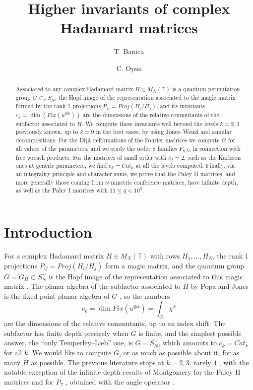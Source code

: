 \documentclass[11pt]{amsart}
\title[Complex Hadamard matrices]{Higher invariants of complex Hadamard matrices}
\author{T. Banica}
\author{C. Opus}
\newcommand{\T}{\mathbb T}
\begin{document}
\begin{abstract}
Associated to any complex Hadamard matrix $H\in M_N(\mathbb T)$ is a quantum permutation group $G\subset_uS_N^+$, the Hopf image of the representation associated to the magic matrix formed by the rank 1 projections $P_{ij}=Proj(H_i/H_j)$, and its invariants $c_k=\dim(Fix(u^{\otimes k}))$ are the dimensions of the relative commutants of the subfactor associated to $H$. We compute these invariants well beyond the levels $k=2,3$ previously known, up to $k=9$ in the best cases, by using Jones--Wenzl and annular decompositions. For the Di\c t\u a deformations of the Fourier matrices we compute $G$ for all values of the parameters, and we study the order 8 families $F_{8,5}$, in connection with free wreath products. For the matrices of small order with $c_2=2$, such as the Karlsson ones at generic parameters, we find $c_k=Cat_k$ at all the levels computed. Finally, via an integrality principle and character sums, we prove that the Paley II matrices, and more generally those coming from symmetric conference matrices, have infinite depth, as well as the Paley I matrices with $11\leq q<10^5$.
\end{abstract}
\maketitle
\setcounter{tocdepth}{1}
\tableofcontents

\section*{Introduction}

For a complex Hadamard matrix $H\in M_N(\T)$ with rows $H_1,\ldots,H_N$, the rank 1 projections $P_{ij}=Proj(H_i/H_j)$ form a magic matrix, and the quantum group $G=G_H\subset S_N^+$ is the Hopf image of the representation associated to this magic matrix \cite{bb1,bbs}. The planar algebra of the subfactor associated to $H$ by Popa and Jones \cite{jon,pop} is the fixed point planar algebra of $G$ \cite{bbs}, so the numbers
$$c_k=\dim Fix(u^{\otimes k})=\int_G\chi^k$$
are the dimensions of the relative commutants, up to an index shift. The subfactor has finite depth precisely when $G$ is finite, and the simplest possible answer, the ``only Temperley--Lieb'' one, is $G=S_N^+$, which amounts to $c_k=Cat_k$ for all $k$. We would like to compute $G$, or as much as possible about it, for as many $H$ as possible. The previous literature stops at $k=2,3$, rarely $4$ \cite{cn,ni}, with the notable exception of the infinite depth results of Montgomery for the Paley II matrices and for $P_7$ \cite{mo2,mo3}, obtained with the angle operator \cite{mo1,swa}.
\end{document}
